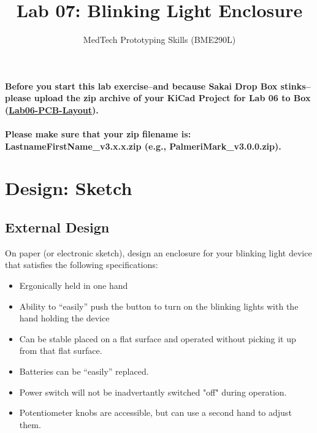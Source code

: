 \documentclass[10pt]{article}
\begin{document}
\title{Lab 07: Blinking Light Enclosure} 
\author{MedTech Prototyping Skills (BME290L)}
\maketitle

\textbf{Before you start this lab exercise--and because Sakai Drop Box
stinks--please upload the zip archive of your KiCad Project for Lab 06 to Box
(\href{https://duke.box.com/s/e0xdfqhgh0933gnydfww605tubeysxft}{Lab06-PCB-Layout}).\\\\
Please make sure that your zip filename is: LastnameFirstName\_v3.x.x.zip
(e.g., PalmeriMark\_v3.0.0.zip).}
\section{Design: Sketch}
\subsection{External Design}
On paper (or electronic sketch), design an enclosure for your blinking light
device that satisfies the following specifications:
\begin{itemize}
    \item Ergonically held in one hand
    \item Ability to ``easily'' push the button to turn on the blinking lights
        with the hand holding the device
    \item Can be stable placed on a flat surface and operated without picking it up from that flat surface.
    \item Batteries can be ``easily'' replaced.
    \item Power switch will not be inadvertantly switched "off" during operation.
    \item Potentiometer knobs are accessible, but can use a second hand to
        adjust them.
\end{itemize}
\end{document}
